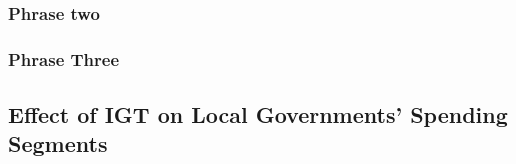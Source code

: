 \subsubsection{Phrase two}




\subsubsection{Phrase Three}


\subsection{Effect of IGT on Local Governments' Spending Segments}


\section{}





